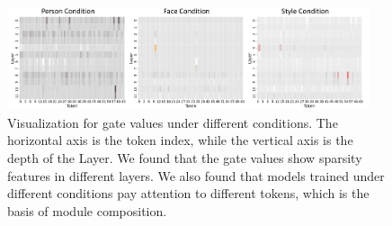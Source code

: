 \begin{figure}[t]
    \centering
    \includegraphics[width=0.95\textwidth]{images/token_visualization.pdf}
    \caption{Visualization for gate values under different conditions. The horizontal axis is the token index, while the vertical axis is the depth of the Layer. We found that the gate values show sparsity features in different layers. We also found that models trained under different conditions pay attention to different tokens, which is the basis of module composition.}
    \label{fig:gate_vis}
\end{figure}





